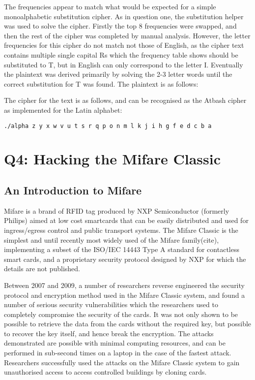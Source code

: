 \documentclass[pdflatex, a4paper,12pt]{article}
\begin{document}
The frequencies appear to match what would be expected for a simple
monoalphabetic substitution cipher. As in question one, the substitution helper
was used to solve the cipher.
Firstly the top 8 frequencies were swapped, and then the rest of the cipher was
completed by manual analysis. However, the letter frequencies for this cipher
do not match not those of English, as the cipher text contains multiple single capital
Rs which the frequency table shows should be substituted to T, but in English
can only correspond to the letter I. Eventually the plaintext was derived
primarily by solving the 2-3 letter words until the correct substitution for T
was found. The plaintext is as follows:

\begin{quote}
    
\end{quote}    

The cipher for the text is as follows, and can be recognised as the Atbash
cipher as implemented for the Latin alphabet:

\begin{verbatim}
./alpha z y x w v u t s r q p o n m l k j i h g f e d c b a
\end{verbatim}

\section{Q4: Hacking the Mifare Classic}

\subsection{An Introduction to Mifare}

Mifare is a brand of RFID tag produced by NXP Semiconductor (formerly Philips)
aimed at low cost smartcards that can be easily distributed and used for
ingress/egress control and public transport systems. The Mifare Classic is the
simplest and until recently most widely used of the Mifare family(cite),
implementing a subset of the ISO/IEC 14443 Type A standard for contactless smart
cards, and a proprietary security protocol designed by NXP for which the details
are not published.

Between 2007 and 2009, a number of researchers reverse engineered the security
protocol and encryption method used in the Mifare Classic system, and found a
number of serious security vulnerabilities which the researchers used to
completely compromise the security of the cards. It was not only shown to be
possible to retrieve the data from the cards without the required key, but
possible to recover the key itself, and hence break the encryption. The attacks
demonstrated are possible with minimal computing resources, and can be performed
in sub-second times on a laptop in the case of the fastest attack. Researchers
successfully used the attacks on the Mifare Classic system to gain unauthorised
access to access controlled buildings by cloning
cards\cite{digitalsecurityrun_mifare_2008}.
\end{document}
